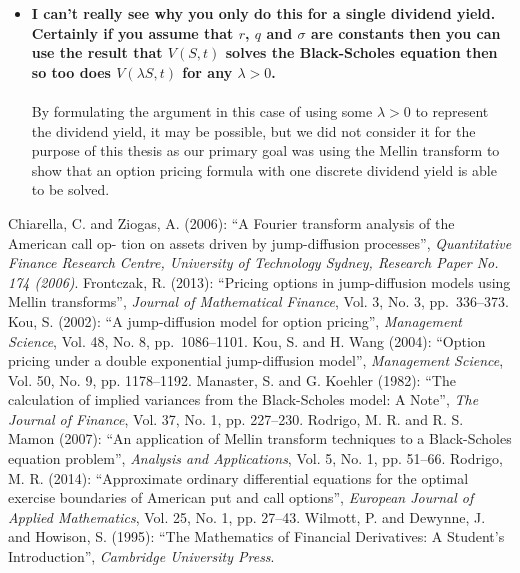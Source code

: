 \documentclass{article}
\begin{document}
\begin{enumerate}
\begin{itemize}
			\item{\textbf{I can't really see why you only do this for a single dividend yield. Certainly if you assume that $r$, $q$ and $\sigma$ are constants then you can use the result that $V(S,t)$ solves the Black-Scholes equation then so too does $V(\lambda S,t)$ for any $\lambda > 0$.}
			\\\\}
			By formulating the argument in this case of using some $\lambda > 0$ to represent the dividend yield, it may be possible, but we did not consider it for the purpose of this thesis as our primary goal was using the Mellin transform to show that an option pricing formula with one discrete dividend yield is able to be solved.
		\end{itemize}
\end{enumerate}

\begin{thebibliography}{100}
 Chiarella, C. and Ziogas, A. (2006): ``A Fourier transform analysis of the American call op- tion on assets driven by jump-diffusion processes'', \emph{Quantitative Finance Research Centre, University of Technology Sydney, Research Paper No. 174 (2006)}.
 Frontczak, R. (2013): ``Pricing options in jump-diffusion models using Mellin transforms'', \emph{Journal of Mathematical Finance}, Vol. 3, No. 3, pp.~336--373.
 Kou, S. (2002): ``A jump-diffusion model for option pricing'', \emph{Management Science}, Vol. 48, No. 8, pp.~1086--1101.
	 Kou, S. and H. Wang (2004): ``Option pricing under a double exponential jump-diffusion model'', \emph{Management Science}, Vol. 50, No. 9, pp. 1178--1192.
	 Manaster, S. and G. Koehler (1982): ``The calculation of implied variances from the Black-Scholes model: A Note'', \emph{The Journal of Finance}, Vol. 37, No. 1, pp. 227--230.
	 Rodrigo, M. R. and R. S. Mamon (2007): ``An application of Mellin transform techniques to a Black-Scholes equation problem'', \emph{Analysis and Applications}, Vol. 5, No. 1, pp. 51--66.
	 Rodrigo, M. R. (2014): ``Approximate ordinary differential equations for the optimal exercise boundaries of American put and call options'', \emph{European Journal of Applied Mathematics}, Vol. 25, No. 1, pp. 27--43.
	 Wilmott, P. and Dewynne, J. and Howison, S. (1995): ``The Mathematics of Financial Derivatives: A Student's Introduction'', \emph{Cambridge University Press}.

\end{thebibliography}
\end{document}
